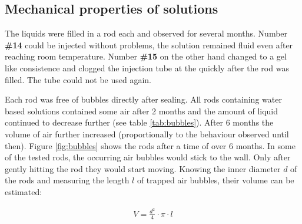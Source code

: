\clearpage

\subsection{Mechanical properties of solutions}
\label{sec:sol-mech}

The liquids were filled in a rod each and observed for several months.
Number \textbf{\#14} could be injected without problems, the solution remained fluid even after reaching room temperature.
Number \textbf{\#15} on the other hand changed to a gel like consistence and clogged the injection tube at the quickly after the rod was filled.
The tube could not be used again.

Each rod was free of bubbles directly after sealing.
All rods containing water based solutions contained some air after 2 months and the amount of liquid continued to decrease further (see table \ref{tab:bubbles}).
After 6 months the volume of air further increased (proportionally to the behaviour observed until then).
Figure \ref{fig:bubbles} shows the rods after a time of over 6 months.
In some of the tested rods, the occurring air bubbles would stick to the wall.
Only after gently hitting the rod they would start moving.
Knowing the inner diameter $d$ of the rods and measuring the length $l$ of trapped air bubbles, their volume can be estimated:

\begin{align}
 V = \frac{d^2}{4}\cdot \pi \cdot l
\end{align}

